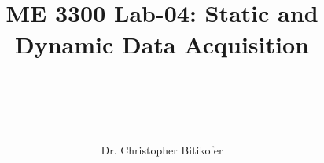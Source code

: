 
\title{
\begin{center}
\HRule \\[0.4cm]
{\Huge \bfseries ME 3300 Lab-04: 
Static and Dynamic Data Acquisition
 \\[0.5cm] 
}\\[0.4cm] %
\HRule \\[1.5cm]
\end{center}
}
\author{\Large Dr. Christopher Bitikofer \\ \\ \\[.1cm]} %
\date{} %

\maketitle
\tableofcontents